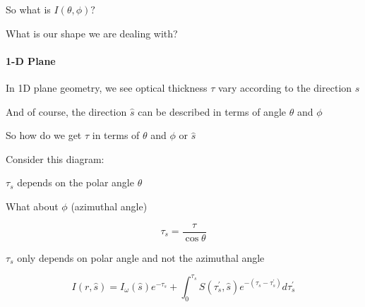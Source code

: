 \documentclass[12pt]{article}
\renewcommand{\_}{\kern-1.5pt\textunderscore\kern-1.5pt}
\begin{document}
So what is  \( I \left(  \theta , \phi  \right) ? \) \par

What is our shape we are dealing with?\par

\paragraph{1-D Plane }\par

In 1D plane geometry, we see optical thickness  \(  \tau \)  vary according to the direction  \( \hat{s} \) \par

\par

And of course, the direction  \( \hat{s} \)  can be described in terms of angle  \(  \theta  \)  and  \(  \phi   \) \par

So how do we get  \(  \tau \)  in terms of  \(  \theta  \)  and  \(  \phi  \)  or  \( \hat{s} \) \par

Consider this diagram:\par

\par

 \(  \tau_{s} \)  depends on the polar angle  \(  \theta  \) \par

What about  \(  \phi  \)  (azimuthal angle)\par

 \[  \tau_{s}=\frac{ \tau}{\cos  \theta } \] \par


\vspace{\baselineskip}

\vspace{\baselineskip}

\vspace{\baselineskip}
\par

 \(  \tau_{s} \)  only depends on polar angle and not the azimuthal angle\par

 \[ I \left( r,\hat{s} \right) =I_{ \omega } \left( \hat{s} \right) e^{- \tau_{s}}+ \int _{0}^{ \tau_{s}}S \left(  \tau_{s}^{'},\hat{s} \right) e^{- \left(  \tau_{s}- \tau_{s}^{'} \right) }d \tau_{s}^{'} \] \par
\end{document}
